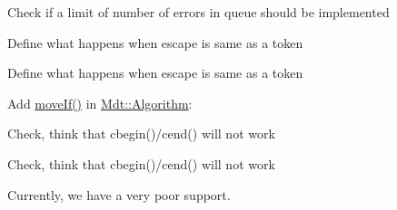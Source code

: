 
\begin{DoxyRefList}
\item[\label{todo__todo000006}%
\hypertarget{todo__todo000006}{}%
Namespace \hyperlink{namespace_mdt}{Mdt} ]Check if a limit of number of errors in queue should be implemented  
\item[\label{todo__todo000001}%
\hypertarget{todo__todo000001}{}%
Member \hyperlink{namespace_mdt_1_1_algorithm_aadf56549e804ffc292f5b61d4872512b}{Mdt\+:\+:Algorithm\+:\+:index\+Of\+First\+Escaped\+Token} (const Q\+String \&str, int from, const std\+::vector$<$ Q\+Char $>$ \&tokens, const Q\+Char \&escape)]Define what happens when escape is same as a token  
\item[\label{todo__todo000002}%
\hypertarget{todo__todo000002}{}%
Member \hyperlink{namespace_mdt_1_1_algorithm_a25b3247b25cdf25db6a2641269e37e0d}{Mdt\+:\+:Algorithm\+:\+:index\+Of\+First\+Non\+Escaped\+Token} (const Q\+String \&str, int from, const std\+::vector$<$ Q\+Char $>$ \&tokens, const Q\+Char \&escape)]Define what happens when escape is same as a token  
\item[\label{todo__todo000003}%
\hypertarget{todo__todo000003}{}%
Member \hyperlink{namespace_mdt_1_1_algorithm_a1f739be25cc7de2c30a21b85d9b25f0a}{Mdt\+:\+:Algorithm\+:\+:move\+If} (Forward\+It first, Forward\+It last, Output\+It d\+\_\+first, Unary\+Predicate p)]Add \hyperlink{namespace_mdt_1_1_algorithm_a1f739be25cc7de2c30a21b85d9b25f0a}{move\+If()} in \hyperlink{namespace_mdt_1_1_algorithm}{Mdt\+::\+Algorithm}\+:

Check, think that cbegin()/cend() will not work

Check, think that cbegin()/cend() will not work 
\item[\label{todo__todo000005}%
\hypertarget{todo__todo000005}{}%
Class \hyperlink{class_mdt_1_1_deploy_utils_1_1_platform}{Mdt\+:\+:Deploy\+Utils\+:\+:Platform} ]Currently, we have a very poor support. 
\end{DoxyRefList}